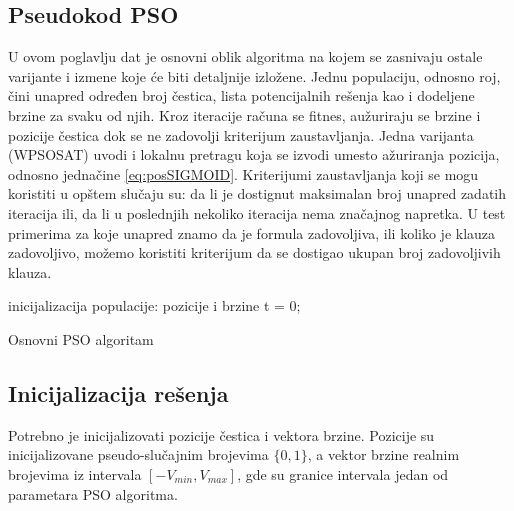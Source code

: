 \documentclass[a4paper]{article}
\begin{document}
 
\subsection{Pseudokod PSO}
\label{sec:pso_pseudokod}
U ovom poglavlju dat je osnovni oblik algoritma na kojem se zasnivaju ostale varijante i izmene koje će biti detaljnije izložene. Jednu populaciju, odnosno roj, čini unapred određen broj čestica, lista potencijalnih rešenja kao i dodeljene brzine za svaku od njih. 
Kroz iteracije računa se fitnes, aužuriraju se brzine i pozicije čestica dok se ne zadovolji kriterijum zaustavljanja. 
Jedna varijanta (WPSOSAT) uvodi i lokalnu pretragu koja se izvodi umesto ažuriranja pozicija, odnosno jednačine \ref{eq:posSIGMOID}.
Kriterijumi zaustavljanja koji se mogu koristiti u opštem slučaju su: da li je dostignut maksimalan broj unapred zadatih iteracija ili, da li u poslednjih nekoliko iteracija nema značajnog napretka.
U test primerima za koje unapred znamo da je formula zadovoljiva, ili koliko je klauza zadovoljivo, možemo koristiti kriterijum da se dostigao ukupan broj zadovoljivih klauza. \\

\begin{algorithm}[H]
\SetAlgoLined
{}

\BlankLine
 inicijalizacija populacije: pozicije i brzine\;
 t = 0; \\
\caption{Osnovni PSO algoritam}
\end{algorithm}


\subsection{Inicijalizacija rešenja}
\label{sec:pso_init}
Potrebno je inicijalizovati pozicije čestica i vektora brzine. Pozicije su inicijalizovane pseudo-slučajnim brojevima $\{0,1\}$, a vektor brzine realnim brojevima iz intervala $[-V_{min}, V_{max}]$, gde su granice intervala jedan od parametara PSO algoritma.
\end{document}
